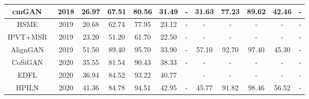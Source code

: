 \documentclass[journal]{IEEEtran}
\begin{document}
\begin{table*}[]
\begin{tabular}{c|c|ccccc|ccccc}
		cmGAN~\cite{dai2018cross}                    & 2018                  & 26.97                       & 67.51                        & 80.56                        & 31.49                    & -              & 31.63                       & 77.23                        & 89.62                        & 42.46                    & -              \\ \hline
		HSME~\cite{hao2019hsme}                     & 2019                  & 20.68                       & 62.74                        & 77.95                        & 23.12                    & -              & -                           & -                            & -                            & -                        & -              \\
		IPVT+MSR~\cite{kang2019person}                 & 2019                  & 23.20                       & 51.20                        & 61.70                        & 22.50                    & -              & -                           & -                            & -                            & -                        & -              \\
		AlignGAN~\cite{wang2019rgb}                 & 2019                  & 51.50                       & 89.40                        & 95.70                        & 33.90                    & -              & 57.10                       & 92.70                        & 97.40                        & 45.30                    & -              \\ \hline
		CoSiGAN~\cite{zhong2020visible}                  & 2020                  & 35.55                       & 81.54                        & 90.43                        & 38.33                    & -              & -                           & -                            & -                            & -                        & -              \\
		EDFL~\cite{liu2020enhancing}                     & 2020                  & 36.94                       & 84.52                        & 93.22                        & 40.77                    &                & -                           & -                            & -                            & -                        & -              \\
		HPILN~\cite{zhao2019hpiln}                    & 2020                  & 41.36                       & 84.78                        & 94.51                        & 42.95                    & -              & 45.77                       & 91.82                        & 98.46                        & 56.52                    & -              \\

\end{tabular}
\end{table*}
\end{document}
